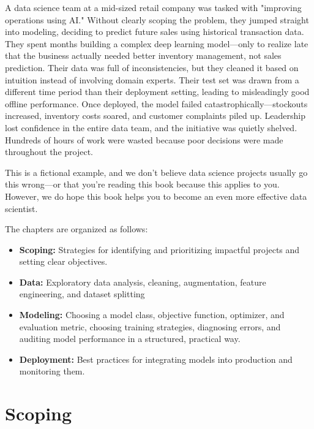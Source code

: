 \documentclass[12pt,openany]{book}
\begin{document}
\begin{examplebox}
A data science team at a mid-sized retail company was tasked with "improving operations using AI." Without clearly scoping the problem, they jumped straight into modeling, deciding to predict future sales using historical transaction data. They spent months building a complex deep learning model—only to realize late that the business actually needed better inventory management, not sales prediction. Their data was full of inconsistencies, but they cleaned it based on intuition instead of involving domain experts. Their test set was drawn from a different time period than their deployment setting, leading to misleadingly good offline performance. Once deployed, the model failed catastrophically—stockouts increased, inventory costs soared, and customer complaints piled up. Leadership lost confidence in the entire data team, and the initiative was quietly shelved. Hundreds of hours of work were wasted because poor decisions were made throughout the project.
\end{examplebox}


This is a fictional example, and we don’t believe data science projects usually go this wrong—or that you’re reading this book because this applies to you. However, we do hope this book helps you to become an even more effective data scientist.
\newline


The chapters are organized as follows:
\begin{itemize}
    \item \textbf{Scoping:} Strategies for identifying and prioritizing impactful projects and setting clear objectives.
    \item \textbf{Data:} Exploratory data analysis, cleaning, augmentation, feature engineering, and dataset splitting
    \item \textbf{Modeling:} Choosing a model class, objective function, optimizer, and evaluation metric, choosing training strategies, diagnosing errors, and auditing model performance in a structured, practical way.
    \item \textbf{Deployment:} Best practices for integrating models into production and monitoring them.
\end{itemize}



\part{Scoping}
\end{document}

